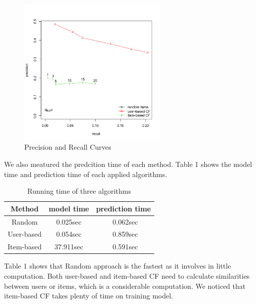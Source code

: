 \documentclass[conference]{IEEEtran}
\begin{document}
\begin{figure}
	\centering
	\includegraphics[width=2.8in]{precision_recall.png}
	\caption{Precision and Recall Curves}
	\label{fig:side:a}
\end{figure}

We also meatured the predcition time of each method. Table 1 shows the model time and prediction time of each applied algorithms. 
\begin{table}
	\caption{Running time of three algorithms}
	\begin{center}
		\begin{tabular}{ccc}
			\hline
			\rule{0pt}{12pt}Method  & \rule{0pt}{12pt}model time   &\rule{0pt}{12pt} prediction time\\
			\hline\rule{0pt}{12pt}
			Random    &   0.025sec & \ 	0.062sec \\
			User-based  &   0.054sec & \ 	0.859sec\\
			Item-based  &   37.911sec & \      0.591sec\\
			\hline
		\end{tabular}
	\end{center}
\end{table}

Table 1 shows that Random approach is the fastest as it involves in little computation. Both user-based and item-based CF need to calculate similarities between users or items, which is a considerable computation. We noticed that item-based CF takes plenty of time on training model.
%
%
\end{document}
